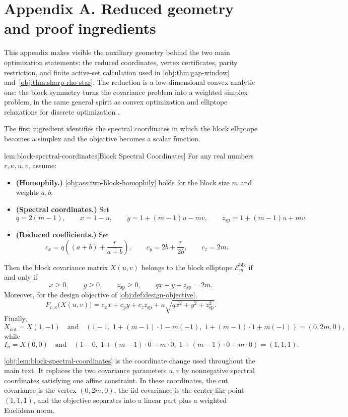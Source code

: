 \section{Appendix A. Reduced geometry and proof ingredients}

This appendix makes visible the auxiliary geometry behind the two main optimization statements: the reduced coordinates, vertex certificates, parity restriction, and finite active-set calculation used in \cref{obj:thm:gap-window} and~\cref{obj:thm:sharp-rho-star}. The reduction is a low-dimensional convex-analytic one: the block symmetry turns the covariance problem into a weighted simplex problem, in the same general spirit as convex optimization \citep{boyd2004} and elliptope relaxations for discrete optimization \citep{goemans1995,deza1997}.

The first ingredient identifies the spectral coordinates in which the block elliptope becomes a simplex and the objective becomes a scalar function.

\begin{lemmav}{lem:block-spectral-coordinates}[Block Spectral Coordinates]
For any real numbers $r,\kappa,u,v$, assume:
\begin{itemize}
\item \textbf{(Homophily.)} \cref{obj:ass:two-block-homophily} holds for the block size $m$ and weights $a,b$.
\item \textbf{(Spectral coordinates.)} Set
\[
q=2(m-1),\qquad
x=1-u,\qquad
y=1+(m-1)u-mv,\qquad
z_{\mathrm{sp}}=1+(m-1)u+mv .
\]
\item \textbf{(Reduced coefficients.)} Set
\[
c_x=q\left((a+b)+\frac{r}{a+b}\right),\qquad
c_y=2b+\frac{r}{2b},\qquad
c_z=2m .
\]
\end{itemize}
Then the block covariance matrix $X(u,v)$ belongs to the block elliptope $\mathcal E_m^{\mathrm{blk}}$ if and only if
\[
x\ge 0,\qquad y\ge 0,\qquad z_{\mathrm{sp}}\ge 0,\qquad
qx+y+z_{\mathrm{sp}}=2m .
\]
Moreover, for the design objective of \cref{obj:def:design-objective},
\[
F_{r,\kappa}\bigl(X(u,v)\bigr)
=
c_xx+c_yy+c_zz_{\mathrm{sp}}
+\kappa\sqrt{qx^2+y^2+z_{\mathrm{sp}}^2}.
\]
Finally,
\[
X_{\mathrm{cut}}=X(1,-1)
\quad\text{and}\quad
(1-1,\;1+(m-1)\cdot 1-m(-1),\;1+(m-1)\cdot 1+m(-1))
=(0,2m,0),
\]
while
\[
I_n=X(0,0)
\quad\text{and}\quad
(1-0,\;1+(m-1)\cdot 0-m\cdot 0,\;1+(m-1)\cdot 0+m\cdot 0)
=(1,1,1).
\]
\end{lemmav}

\cref{obj:lem:block-spectral-coordinates} is the coordinate change used throughout the main text. It replaces the two covariance parameters \(u,v\) by nonnegative spectral coordinates satisfying one affine constraint. In these coordinates, the cut covariance is the vertex \((0,2m,0)\), the iid covariance is the center-like point \((1,1,1)\), and the objective separates into a linear part plus a weighted Euclidean norm.

